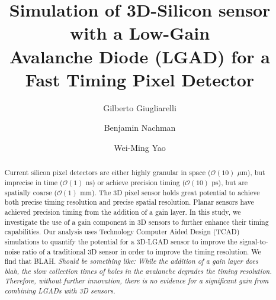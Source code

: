 \documentclass[aps,pt14,superscriptaddress,floatfix,nofootinbib]{revtex4}
\begin{document}
\title{Simulation of 3D-Silicon sensor with a Low-Gain \\ Avalanche Diode (LGAD) for a Fast Timing Pixel Detector}

\author{Gilberto Giugliarelli}

\author{Benjamin Nachman}

\author{Wei-Ming Yao}

\begin{abstract}
Current silicon pixel detectors are either highly granular in space ($\mathcal{O}(10)$ $\mu$m), but imprecise in time ($\mathcal{O}(1)$ ns) or achieve precision timing ($\mathcal{O}(10)$ ps), but are spatially coarse ($\mathcal{O}(1)$ mm).   The 3D pixel sensor holds great potential to achieve both precise timing resolution and precise spatial resolution.  
Planar sensors have achieved precision timing from the addition of a gain layer.  In this study, we investigate the use of a gain component in 3D sensors to further enhance their timing capabilities.  Our analysis uses Technology Computer Aided Design (TCAD) simulations to quantify the potential for a 3D-LGAD sensor to improve the signal-to-noise ratio of a traditional 3D sensor in order to improve the timing resolution.  We find that BLAH. \textit{Should be something like: While the addition of a gain layer does blah, the slow collection times of holes in the avalanche degrades the timing resolution.  Therefore, without further innovation, there is no evidence for a significant gain from combining LGADs with 3D sensors.}
\end{abstract}
\end{document}
